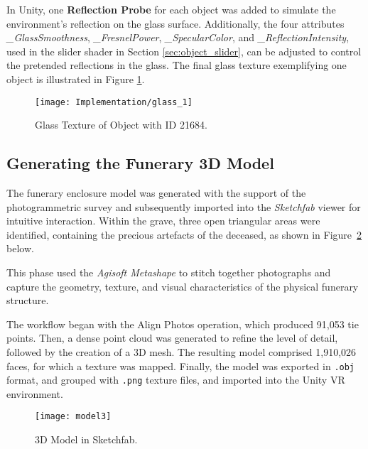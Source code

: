 In Unity, one \textbf{Reflection Probe} for each object was added to simulate the environment's reflection on the glass surface.
Additionally, the four attributes \emph{\_GlassSmoothness}, \emph{\_FresnelPower}, \emph{\_SpecularColor}, and \emph{\_ReflectionIntensity}, used in the slider shader in Section \ref{sec:object_slider}, can be adjusted to control the pretended reflections in the glass.
The final glass texture exemplifying one object is illustrated in Figure \ref{fig:glass1}.

\begin{figure}[h!]
    \centering
    \texttt{[image: Implementation/glass\_1]}
    \caption{Glass Texture of Object with \gls{ID} 21684.}
    \label{fig:glass1}
\end{figure}



\subsection{Generating the Funerary \gls{3D} Model}
\label{sec:build_model}

The funerary enclosure model was generated with the support of the photogrammetric survey and subsequently imported into the \textit{Sketchfab} viewer for intuitive interaction.
Within the grave, three open triangular areas were identified, containing the precious artefacts of the deceased, as shown in Figure~\ref{fig:model3} below.

This phase used the \textit{Agisoft Metashape} to stitch together photographs and capture the geometry, texture, and visual characteristics of the physical funerary structure.

The workflow began with the Align Photos operation, which produced 91,053 tie points. Then, a dense point cloud was generated to refine the level of detail, followed by the creation of a \gls{3D} mesh. The resulting model comprised 1,910,026 faces, for which a texture was mapped.
Finally, the model was exported in \texttt{.obj} format, and grouped with \texttt{.png} texture files, and imported into the Unity \gls{VR} environment.

\begin{figure}[h!]
    \centering
    \texttt{[image: model3]}
    \caption{\gls{3D} Model in Sketchfab.}
    \label{fig:model3}
\end{figure}


